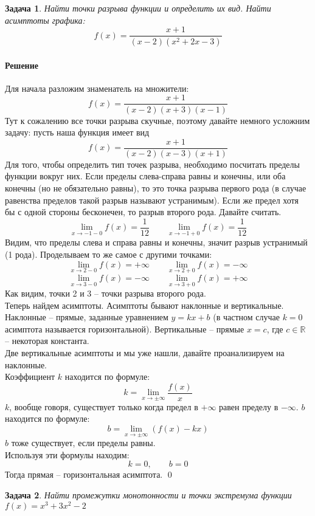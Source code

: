 \documentclass[a4paper,12pt]{report}
\newcommand{\R}{{\mathbb R}}
\newtheorem{problem}{Задача}[chapter]
\newenvironment{sol}{\paragraph{Решение}}{}
\begin{document}
	\begin{problem}
		Найти точки разрыва функции и определить их вид. Найти асимптоты графика:
		\[
		f(x)=\frac{x+1}{(x-2)(x^2+2x-3)}
		\]
	\end{problem}
	\begin{sol}
		Для начала разложим знаменатель на множители:
		\[
		f(x)=\frac{x+1}{(x-2)(x+3)(x-1)}
		\]
		Тут к сожалению все точки разрыва скучные, поэтому давайте немного усложним задачу: пусть наша функция имеет вид
		\[
		f(x)=\frac{x+1}{(x-2)(x-3)(x+1)}
		\]
		Для того, чтобы определить тип точек разрыва, необходимо посчитать пределы функции вокруг них. Если пределы слева-справа равны и конечны, или оба конечны (но не обязательно равны), то это точка разрыва первого рода (в случае равенства пределов такой разрыв называют устранимым). Если же предел хотя бы с одной стороны бесконечен, то разрыв второго рода. Давайте считать.
		\[
		\lim\limits_{x\to-1-0}{f(x)}=\frac{1}{12} \qquad \lim\limits_{x\to-1+0}{f(x)}=\frac{1}{12}
		\]
		Видим, что пределы слева и справа равны и конечны, значит разрыв устранимый (1 рода).
		Проделываем то же самое с другими точками:
		\[
		\lim\limits_{x\to2-0}{f(x)}=+\infty \qquad \lim\limits_{x\to2+0}{f(x)}=-\infty
		\]
		\[
		\lim\limits_{x\to3-0}{f(x)}=-\infty \qquad \lim\limits_{x\to3+0}{f(x)}=+\infty
		\]
		Как видим, точки 2 и 3 -- точки разрыва второго рода.\\
		Теперь найдем асимптоты. Асимптоты бывают наклонные и вертикальные. Наклонные -- прямые, заданные уравнением $y=kx+b$ (в частном случае $k=0$ асимптота называется горизонтальной). Вертикальные -- прямые $x=c$, где $c\in \R$ -- некоторая константа.\\
		Две вертикальные асимптоты  и  мы уже нашли, давайте проанализируем на наклонные.\\
		Коэффициент $k$ находится по формуле:
		\[
		k=\lim\limits_{x\to\pm\infty}{\frac{f(x)}{x}}
		\]
		$k$, вообще говоря, существует только когда предел в $+\infty$ равен пределу в $-\infty$.
		$b$ находится по формуле:
		\[
		b=\lim\limits_{x\to\pm\infty}{(f(x)-kx)}
		\]
		$b$ тоже существует, если пределы равны.\\
		Используя эти формулы находим:
		\[
		k=0, \qquad b=0
		\]
		Тогда прямая  -- горизонтальная асимптота.
		\qed
	\end{sol}
	\begin{problem}
		\label{Extremum2}
		Найти промежутки монотонности и точки экстремума функции $f(x)=x^3+3x^2-2$
	\end{problem}
\end{document}
